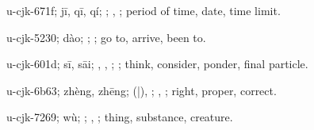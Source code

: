 \begin{multicols}{2}
{\cjkgGlue{}u-cjk-671f; jī, qī, qí; \cjkgGlue{}; \cjkgGlue{}, \cjkgGlue{}; period of time, date, time limit.

\cjkgGlue{}u-cjk-5230; dào; \cjkgGlue{}\cjkgGlue{}\cjkgGlue{}; \cjkgGlue{}; go to, arrive, been to.

\cjkgGlue{}u-cjk-601d; sī, sāi; \cjkgGlue{}\cjkgGlue{}\cjkgGlue{}, \cjkgGlue{}\cjkgGlue{}\cjkgGlue{}, \cjkgGlue{}\cjkgGlue{}\cjkgGlue{}; \cjkgGlue{}; think, consider, ponder, final particle.

\cjkgGlue{}u-cjk-6b63; zhèng, zhēng; \cjkgGlue{}\cjkgGlue{}(\cjkgGlue{}|\cjkgGlue{}), \cjkgGlue{}\cjkgGlue{}\cjkgGlue{}; \cjkgGlue{}, \cjkgGlue{}; right, proper, correct.

\cjkgGlue{}u-cjk-7269; wù; \cjkgGlue{}; \cjkgGlue{}, \cjkgGlue{}; thing, substance, creature.

}
\end{multicols}
